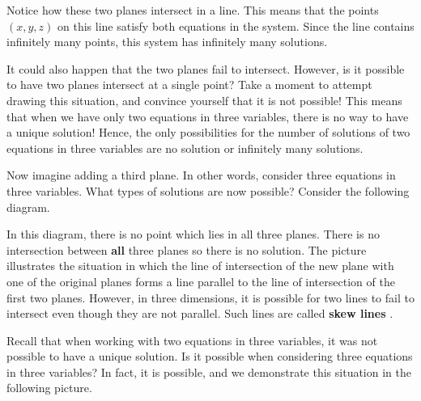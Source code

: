 Notice how these two planes intersect in a line. This means that the
points $(x,y,z)$ on this line satisfy both equations in the
system. Since the line contains infinitely many points, this system
has infinitely many solutions.

It could also happen that the two planes fail to intersect. However,
is it possible to have two planes intersect at a single point? Take a
moment to attempt drawing this situation, and convince yourself that
it is not possible! This means that when we have only two equations in
three variables, there is no way to have a unique solution! Hence, the
only possibilities for the number of solutions of two equations in
three variables are no solution or infinitely many solutions.

Now imagine adding a third plane. In other words, consider three equations in three variables. What types of solutions are now possible? Consider the following diagram.

\begin{center}
\end{center}

In this diagram, there is no point which lies in all three
planes. There is no intersection between \textbf{all} three planes so
there is no solution. The picture illustrates the situation in which
the line of intersection of the new plane with one of the original
planes forms a line parallel to the line of intersection of the first
two planes. However, in three dimensions, it is possible for two lines
to fail to intersect even though they are not parallel. Such lines are
called \textbf{skew lines}%
.

Recall that when working with two equations in three variables, it was
not possible to have a unique solution. Is it possible when
considering three equations in three variables? In fact, it is
possible, and we demonstrate this situation in the following picture.

